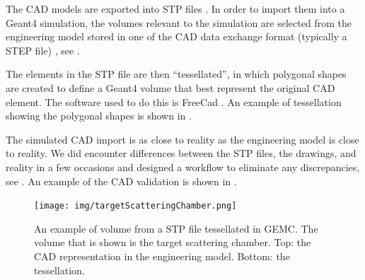 The CAD models are exported into STP files \cite{stepFiles}.
In order to import them into a Geant4 simulation, the volumes relevant to the simulation are selected from the engineering
model stored in one of the CAD data exchange format (typically a STEP file) \cite{cadExchange}, see .


The elements in the STP file are then ``tessellated'', in which polygonal shapes are created to define a Geant4 volume
that best represent the original CAD element.
The software used to do this is FreeCad \cite{freeCad}. An example of tessellation showing the polygonal shapes
is shown in .

The simulated CAD import is as close to reality as the engineering model is close to reality.
We did encounter differences between the STP files, the drawings, and reality in a few occasions and designed
a workflow to eliminate any discrepancies, see .
An example of the CAD validation is shown in .

\begin{figure}
	\centering
	\texttt{[image: img/targetScatteringChamber.png]}
	\caption{An example of volume from a STP file tessellated in GEMC. The volume that is shown is the target scattering chamber.
            Top: the CAD representation in the engineering model. Bottom: the tessellation. }
	\label{fig:targetScatteringChamber}
\end{figure}




